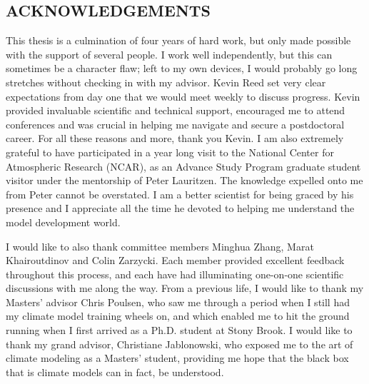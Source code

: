 \documentclass[12pt]{article}
\begin{document}
\newpage
\begin{center}
\section*{\bf{\normalsize ACKNOWLEDGEMENTS}}
\end{center}
\vspace*{4\baselineskip}
This thesis is a culmination of four years of hard work, but only made possible with the support of several people. I work well independently, but this can sometimes be a character flaw; left to my own devices, I would probably go long stretches without checking in with my advisor. Kevin Reed set very clear expectations from day one that we would meet weekly to discuss progress. Kevin provided invaluable scientific and technical support, encouraged me to attend conferences and was crucial in helping me navigate and secure a postdoctoral career. For all these reasons and more, thank you Kevin. I am also extremely grateful to have participated in a year long visit to the National Center for Atmospheric Research (NCAR), as an Advance Study Program graduate student visitor under the mentorship of Peter Lauritzen. The knowledge expelled onto me from Peter cannot be overstated. I am a better scientist for being graced by his presence and I appreciate all the time he devoted to helping me understand the model development world.

I would like to also thank committee members Minghua Zhang, Marat Khairoutdinov and Colin Zarzycki. Each member provided excellent feedback throughout this process, and each have had illuminating one-on-one scientific discussions with me along the way. From a previous life, I would like to thank my Masters' advisor Chris Poulsen, who saw me through a period when I still had my climate model training wheels on, and which enabled me to hit the ground running when I first arrived as a Ph.D. student at Stony Brook. I would like to thank my grand advisor, Christiane Jablonowski, who exposed me to the art of climate modeling as a Masters' student, providing me hope that the black box that is climate models can in fact, be understood.
\end{document}
